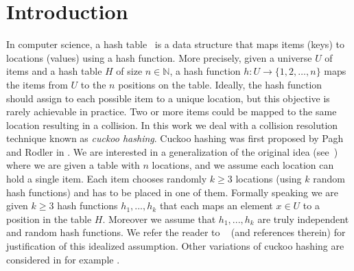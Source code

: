 \section{Introduction}
In computer science, a hash table~\cite{bookC:09} is a data structure that maps items (keys) to locations (values) using a hash function. More precisely, given a universe $U$ of items and a hash table $H$ of size $n \in \mathbb{N}$, a hash function
$h : U \rightarrow \{1,2,\ldots, n\}$ maps the items from $U$ to the $n$ positions on the table. Ideally, the hash function should assign to each possible item to a unique location, but this objective is rarely achievable in practice. Two or more items could be mapped to the same location resulting in a collision. In this work we deal with a collision resolution technique known as \emph{cuckoo hashing}.  Cuckoo hashing was first proposed by Pagh and Rodler in \cite{inp:pr01}. We are interested in a generalization of the original idea (see~\cite{inc:fpss03}) where we are given a table with $n$ locations, and we assume each location can hold a single item. Each item chooses randomly $k\ge 3$ locations (using $k$ random hash functions) and has to be placed in one of them.  Formally speaking we are given $k\ge3$ hash functions $h_1, . . . , h_k$
that each maps an element $x \in U$ to a position in the table $H$. 
Moreover we assume that $h_1, . . . , h_k$ are truly independent and random hash functions. We refer the reader to ~\cite{ms:08,d:09}  (and references therein) for justification of this idealized assumption. 
 Other variations of cuckoo hashing are considered in for example \cite{inp:ans:09,art:kmw09}.


